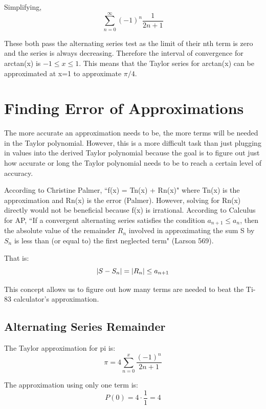 \documentclass[12pt, titlepage]{article}
\begin{document}
Simplifying,
\begin{equation}
    \sum_{n=0}^{\infty} (-1)^{n} \frac{1}{2n+1}
\end{equation}

These both pass the alternating series test as the limit of their nth term is zero and the series is always decreasing. Therefore the interval of convergence for arctan(x) is \( -1 \leq x \leq 1 \). This means that the Taylor series for arctan(x) can be approximated at x=1 to approximate \(\pi/4\).

\section{Finding Error of Approximations}
The more accurate an approximation needs to be, the more terms will be needed in the Taylor polynomial. However, this is a more difficult task than just plugging in values into the derived Taylor polynomial because the goal is to figure out just how accurate or long the Taylor polynomial needs to be to reach a certain level of accuracy.

According to Christine Palmer, ``f(x) = Tn(x) + Rn(x)" where Tn(x) is the approximation and Rn(x) is the error (Palmer). However, solving for Rn(x) directly would not be beneficial because f(x) is irrational.
According to Calculus for AP, ``If a convergent alternating series satisfies the condition \(a_{n+1} \leq a_{n} \), then the absolute value of the remainder \(R_{n}\) involved in approximating the sum S by \(S_{n}\) is less than (or equal to) the first neglected term" (Larson 569).

That is:
\begin{equation}
  \abs{S - S_{n}} = \abs{R_{n}} \leq a_{n + 1}
\end{equation}

This concept allows us to figure out how many terms are needed to beat the Ti-83 calculator's approximation.

\subsection{Alternating Series Remainder}
The Taylor approximation for pi is:
\begin{equation}
  \pi = 4\sum_{n=0}^{x}{ \frac{(-1)^n}{2n+1}}
\end{equation}

The approximation using only one term is:
\begin{equation}
  P(0) = 4 \cdot \frac{1}{1} = 4
\end{equation}
\end{document}
